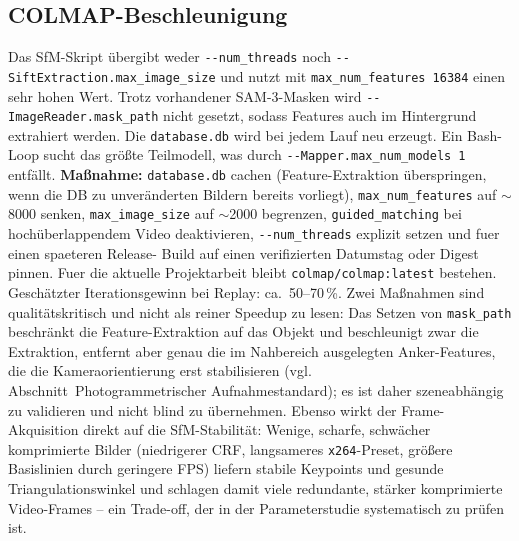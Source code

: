 \documentclass[12pt,a4paper]{article}
\begin{document}
\subsection{COLMAP-Beschleunigung}
Das SfM-Skript übergibt weder \texttt{-{}-num\_threads} noch
\texttt{-{}-SiftExtraction.max\_image\_size} und nutzt mit
\texttt{max\_num\_features 16384} einen sehr hohen Wert. Trotz vorhandener
SAM-3-Masken wird \texttt{-{}-ImageReader.mask\_path} nicht gesetzt, sodass
Features auch im Hintergrund extrahiert werden. Die \texttt{database.db} wird
bei jedem Lauf neu erzeugt. Ein Bash-Loop sucht das größte Teilmodell, was
durch \texttt{-{}-Mapper.max\_num\_models 1} entfällt. \textbf{Maßnahme:}
\texttt{database.db} cachen (Feature-Extraktion überspringen, wenn die DB zu
unveränderten Bildern bereits vorliegt), \texttt{max\_num\_features} auf
$\sim$8000 senken, \texttt{max\_image\_size} auf $\sim$2000 begrenzen,
\texttt{guided\_matching} bei hochüberlappendem Video deaktivieren,
\texttt{-{}-num\_threads} explizit setzen und fuer einen spaeteren Release-
Build auf einen verifizierten Datumstag oder Digest pinnen. Fuer die aktuelle
Projektarbeit bleibt \texttt{colmap/colmap:latest} bestehen. Geschätzter
Iterationsgewinn bei
Replay: ca.~50--70\,\%. Zwei Maßnahmen sind qualitätskritisch und nicht
als reiner Speedup zu lesen: Das Setzen von \texttt{mask\_path} beschränkt die
Feature-Extraktion auf das Objekt und beschleunigt zwar die Extraktion, entfernt
aber genau die im Nahbereich ausgelegten Anker-Features, die die
Kameraorientierung erst stabilisieren (vgl. Abschnitt~Photogrammetrischer
Aufnahmestandard); es ist daher szeneabhängig zu validieren und nicht
blind zu übernehmen. Ebenso wirkt der Frame-Akquisition direkt auf die
SfM-Stabilität: Wenige, scharfe, schwächer komprimierte Bilder (niedrigerer
CRF, langsameres \texttt{x264}-Preset, größere Basislinien durch geringere
FPS) liefern stabile Keypoints und gesunde Triangulationswinkel und schlagen
damit viele redundante, stärker komprimierte Video-Frames -- ein
Trade-off, der in der Parameterstudie systematisch zu prüfen ist.
\end{document}
